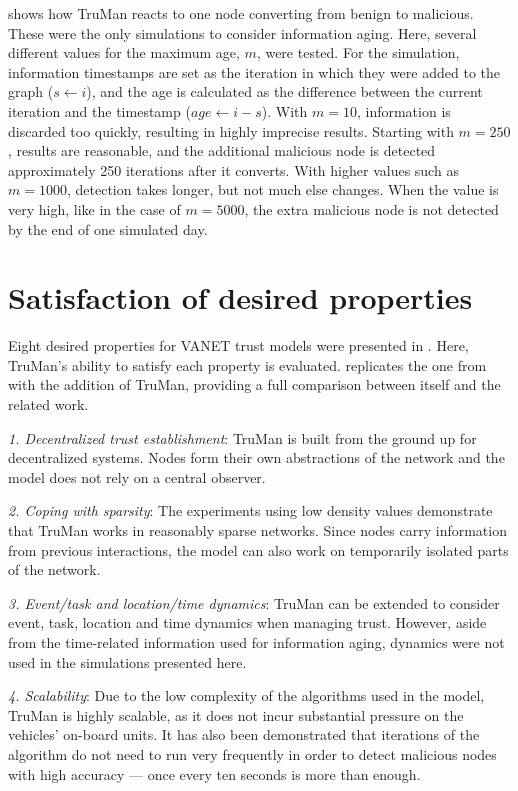 \pagebreak
{} shows how TruMan reacts to one node converting from benign to malicious.
These were the only simulations to consider information aging.
Here, several different values for the maximum age, $m$, were tested.
For the simulation, information timestamps are set as the iteration in which they were added to the graph ($s \gets i$), and the age is calculated as the difference between the current iteration and the timestamp ($age \gets i - s$).
With $m=10$, information is discarded too quickly, resulting in highly imprecise results.
Starting with $m=250$, results are reasonable, and the additional malicious node is detected approximately 250 iterations after it converts.
With higher values such as $m=1000$, detection takes longer, but not much else changes. 
When the value is very high, like in the case of $m=5000$, the extra malicious node is not detected by the end of one simulated day.



\section{Satisfaction of desired properties}
\label{section:satisfaction}

Eight desired properties for VANET trust models were presented in .
Here, TruMan's ability to satisfy each property is evaluated.
 replicates the one from  with the addition of TruMan, providing a full comparison between itself and the related work.

\textit{1. Decentralized trust establishment}:
TruMan is built from the ground up for decentralized systems.
Nodes form their own abstractions of the network and the model does not rely on a central observer.

\textit{2. Coping with sparsity}:
The experiments using low density values demonstrate that TruMan works in reasonably sparse networks.
Since nodes carry information from previous interactions, the model can also work on temporarily isolated parts of the network.

\textit{3. Event/task and location/time dynamics}:
TruMan can be extended to consider event, task, location and time dynamics when managing trust.
However, aside from the time-related information used for information aging, dynamics were not used in the simulations presented here.

\textit{4. Scalability}: 
Due to the low complexity of the algorithms used in the model, TruMan is highly scalable, as it does not incur substantial pressure on the vehicles' on-board units.
It has also been demonstrated that iterations of the algorithm do not need to run very frequently in order to detect malicious nodes with high accuracy --- once every ten seconds is more than enough.

